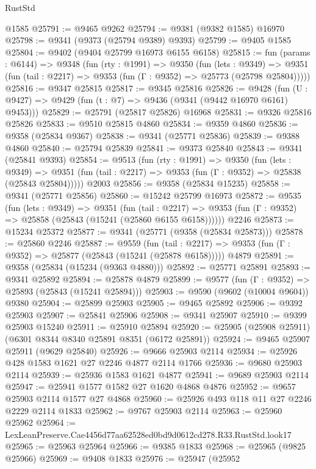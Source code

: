\begin{lexlean}{RustStd}
\begin{coremodule}
    @1585
@25791 := @9465 @9262
@25794 := @9381 (@9382 @1585) @16970
@25798 := @9341 (@9373 (@25794 @9389) @9393)
@25799 := @9405 @1585
@25804 := @9402 (@9404 @25799 @16973 @6155 @6158)
@25815 := fun (params : @6144) =>
  @9348
    (fun (rty : @1991) =>
    @9350
      (fun (lets : @9349) =>
      @9351 (fun (tail : @2217) => @9353 (fun (Γ : @9352) => @25773 (@25798 @25804)))))
@25816 := @9347 @25815
@25817 := @9345 @25816
@25826 := @9428
    (fun (U : @9427) => @9429 (fun (t : @7) => @9436 (@9341 (@9442 @16970 @6161) @9453)))
@25829 := @25791 (@25817 @25826) @16968
@25831 := @9326 @25816 @25826
@25833 := @9510 @25815 @4860
@25834 := @9359 @4860
@25836 := @9358 (@25834 @9367)
@25838 := @9341 (@25771 @25836)
@25839 := @9388 @4860
@25840 := @25794 @25839
@25841 := @9373 @25840
@25843 := @9341 (@25841 @9393)
@25854 := @9513
    (fun (rty : @1991) =>
    @9350
      (fun (lets : @9349) =>
      @9351 (fun (tail : @2217) => @9353 (fun (Γ : @9352) => @25838 (@25843 @25804)))))
    @2003
@25856 := @9358 (@25834 @15235)
@25858 := @9341 (@25771 @25856)
@25860 := @15242 @25799 @16973
@25872 := @9535
    (fun (lets : @9349) =>
    @9351
      (fun (tail : @2217) =>
      @9353 (fun (Γ : @9352) => @25858 (@25843 (@15241 (@25860 @6155 @6158))))))
    @2246
@25873 := @15234 @25372
@25877 := @9341 (@25771 (@9358 (@25834 @25873)))
@25878 := @25860 @2246
@25887 := @9559
    (fun (tail : @2217) => @9353 (fun (Γ : @9352) => @25877 (@25843 (@15241 (@25878 @6158)))))
    @4879
@25891 := @9358 (@25834 (@15234 (@9363 @4880)))
@25892 := @25771 @25891
@25893 := @9341 @25892
@25894 := @25878 @4879
@25899 := @9577 (fun (Γ : @9352) => @25893 (@25843 (@15241 @25894)))
@25903 := @9590 (@9602 (@10004 @9604)) @9380
@25904 := @25899 @25903
@25905 := @9465 @25892
@25906 := @9392 @25903
@25907 := @25841 @25906
@25908 := @9341 @25907
@25910 := @9399 @25903 @15240
@25911 := @25910 @25894
@25920 := @25905 (@25908 @25911) (@6301 @8344 @8340 @25891 @8351 (@6172 @25891))
@25924 := @9465 @25907 @25911 (@9629 @25840)
@25926 := @9666 @25903 @2114
@25934 := @25926 @428 @1583 @1621 @27 @2246 @4877 @2114 @1766
@25936 := @9680 @25903 @2114
@25939 := @25936 @1583 @1621 @4877
@25941 := @9689 @25903 @2114
@25947 := @25941 @1577 @1582 @27 @1620 @4868 @4876
@25952 := @9657 @25903 @2114 @1577 @27 @4868
@25960 := @25926 @493 @118 @11 @27 @2246 @2229 @2114 @1833
@25962 := @9767 @25903 @2114
@25963 := @25960 @25962
@25964 := LexLeanPreserve.Cae4456d77aa62528ed0bd9d0612cd278.R33.RustStd.look17
@25965 := @25963 @25964
@25966 := @9385 @1833
@25968 := @25965 (@9825 @25966)
@25969 := @9408 @1833
@25976 := @25947
    (@25952

\end{coremodule}
\end{lexlean}
